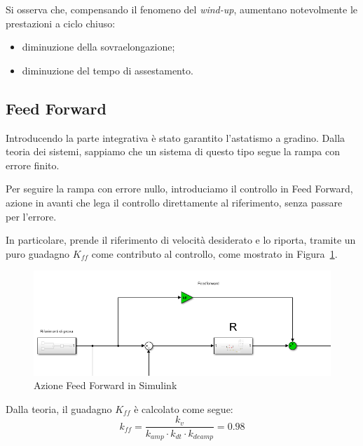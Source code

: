 \documentclass[a4paper,12pt]{article}
\begin{document}
\vspace{0.5cm}

Si osserva che, compensando il fenomeno del \textit{wind-up}, aumentano notevolmente le prestazioni a ciclo chiuso:
\begin{itemize}
    \item diminuzione della sovraelongazione;
    \item diminuzione del tempo di assestamento.
\end{itemize}

\vspace{0.5cm}

\subsection{Feed Forward}

Introducendo la parte integrativa è stato garantito l'astatismo a gradino. Dalla teoria dei sistemi, sappiamo che un sistema di questo tipo segue la rampa con errore finito.

Per seguire la rampa con errore nullo, introduciamo il controllo in Feed Forward, azione in avanti che lega il controllo direttamente al riferimento, senza passare per l'errore.

In particolare, prende il riferimento di velocità desiderato e lo riporta, tramite un puro guadagno $K_{ff}$ come contributo al controllo, come mostrato in Figura~\ref{fig: FFSimulink}. 

\vspace{0.5cm}

\begin{figure}[h!]
    \centering
    \includegraphics[scale=0.6]{Immagini/Altre/feedForwardSimulink.PNG}
    \caption{Azione Feed Forward in Simulink}
    \label{fig: FFSimulink}
\end{figure}

\vspace{0.5cm}

Dalla teoria, il guadagno $K_{ff}$ è calcolato come segue:
\[
    k_{ff} = \frac{k_v}{k_{amp} \cdot k_{dt} \cdot k_{deamp}}=0.98
\]
\end{document}
